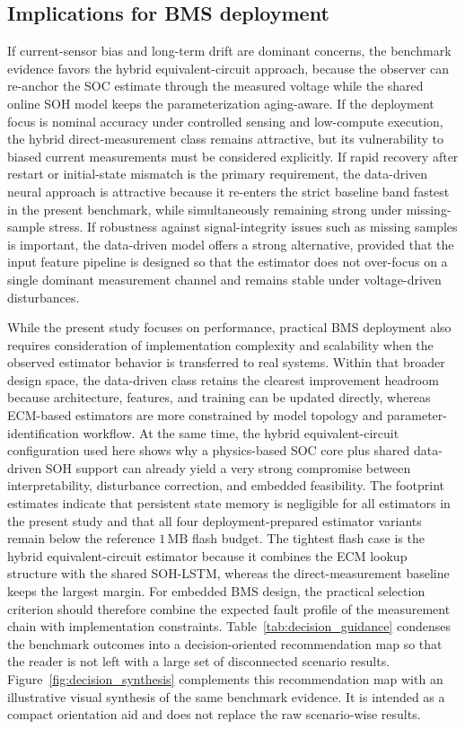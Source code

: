 \documentclass[review]{elsarticle}
\begin{document}
\subsection{Implications for BMS deployment}
If current-sensor bias and long-term drift are dominant concerns, the benchmark evidence favors the hybrid equivalent-circuit approach, because the observer can re-anchor the SOC estimate through the measured voltage while the shared online SOH model keeps the parameterization aging-aware. If the deployment focus is nominal accuracy under controlled sensing and low-compute execution, the hybrid direct-measurement class remains attractive, but its vulnerability to biased current measurements must be considered explicitly. If rapid recovery after restart or initial-state mismatch is the primary requirement, the data-driven neural approach is attractive because it re-enters the strict baseline band fastest in the present benchmark, while simultaneously remaining strong under missing-sample stress. If robustness against signal-integrity issues such as missing samples is important, the data-driven model offers a strong alternative, provided that the input feature pipeline is designed so that the estimator does not over-focus on a single dominant measurement channel and remains stable under voltage-driven disturbances.

While the present study focuses on performance, practical BMS deployment also requires consideration of implementation complexity and scalability when the observed estimator behavior is transferred to real systems. Within that broader design space, the data-driven class retains the clearest improvement headroom because architecture, features, and training can be updated directly, whereas ECM-based estimators are more constrained by model topology and parameter-identification workflow. At the same time, the hybrid equivalent-circuit configuration used here shows why a physics-based SOC core plus shared data-driven SOH support can already yield a very strong compromise between interpretability, disturbance correction, and embedded feasibility. The footprint estimates indicate that persistent state memory is negligible for all estimators in the present study and that all four deployment-prepared estimator variants remain below the reference $1\,\mathrm{MB}$ flash budget. The tightest flash case is the hybrid equivalent-circuit estimator because it combines the ECM lookup structure with the shared SOH-LSTM, whereas the direct-measurement baseline keeps the largest margin. For embedded BMS design, the practical selection criterion should therefore combine the expected fault profile of the measurement chain with implementation constraints. Table~\ref{tab:decision_guidance} condenses the benchmark outcomes into a decision-oriented recommendation map so that the reader is not left with a large set of disconnected scenario results. Figure~\ref{fig:decision_synthesis} complements this recommendation map with an illustrative visual synthesis of the same benchmark evidence. It is intended as a compact orientation aid and does not replace the raw scenario-wise results.
\end{document}
